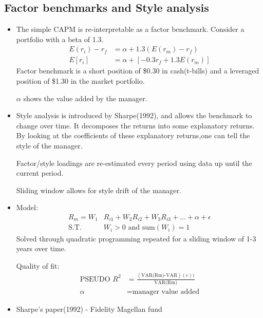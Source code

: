 \documentclass{maths}
\begin{document}
\subsection{Factor benchmarks and Style analysis}
\begin{itemize}

\item The simple CAPM is re-interpretable as a factor benchmark. Consider a portfolio with a beta of 1.3.
\begin{align*}
E(r_i)-r_f &=\alpha+1.3(E(r_m)-r_f)\\
E[r_i]&=\alpha+[-0.3r_f+1.3E(r_m)]
\end{align*}
Factor benchmark is a short position of \$0.30 in cash(t-bills) and a leveraged position of \$1.30 in the market portfolio.

$\alpha$ shows the value added by the manager.

\item Style analysis is introduced by Sharpe(1992), and allows the benchmark to change over time. It decomposes the returns into some explanatory returns. By looking at the coefficients of these explanatory returns,one can tell the style of the manager.

Factor/style loadings are re-estimated every period using data up until the current period.

Sliding window allows for style drift of the manager.

\item Model:
\begin{align*}
R_m = W_1&R_{i1}+W_2R_{i2}+W_3R_{i3}+...+\alpha+\epsilon \\
\text{S.T. }& W_i > \text{0 and sum}(W_i) = 1
\end{align*}
Solved through quadratic programming repeated for a sliding window of 1-3 years over time.

Quality of fit:
\begin{align*}
\text{PSEUDO }R^2 &=\frac{(\text{VAR(Rm)-VAR})(\epsilon))}{\text{VAR(Rm)}}\\
\alpha &= \text{manager value added}
\end{align*}
\item Sharpe's paper(1992) - Fidelity Magellan fund


\end{itemize}
\end{document}
